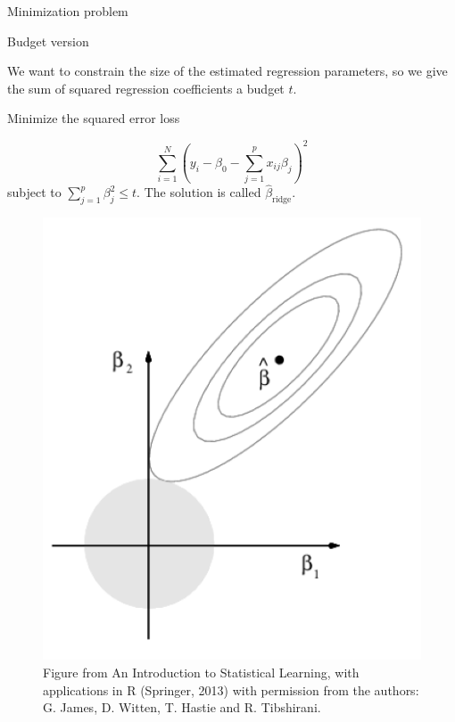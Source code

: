 \documentclass[
  ignorenonframetext,
]{beamer}
\begin{document}
\begin{frame}

\begin{block}{Minimization problem}

\begin{block}{Budget version}

We want to constrain the size of the estimated regression parameters, so
we give the sum of squared regression coefficients a budget \(t\).

Minimize the squared error loss

\[ \sum_{i=1}^N (y_i-\beta_0-\sum_{j=1}^p x_{ij}\beta_j )^2 \] subject
to \(\sum_{j=1}^p \beta_j^2 \le t\). The solution is called
\(\hat{\beta}_{\text{ridge}}\).

\end{block}

\end{block}

\end{frame}

\begin{frame}

\begin{figure}
\includegraphics[width=0.4\linewidth]{./ILS67ridge} \caption{Figure from An Introduction to Statistical Learning, with applications in R (Springer, 2013) with permission from the authors: G. James, D. Witten, T. Hastie and R. Tibshirani.}\label{fig:unnamed-chunk-8}
\end{figure}

\end{frame}
\end{document}
